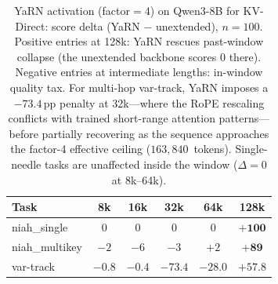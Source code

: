\begin{table}[tb]
\centering
\small
\begin{tabular}{@{}lccccc@{}}
\toprule
\textbf{Task} & 8k & 16k & 32k & 64k & 128k \\
\midrule
niah\_single & $0$ & $0$ & $0$ & $0$ & $\mathbf{+100}$ \\
niah\_multikey & $-2$ & $-6$ & $-3$ & $+2$ & $\mathbf{+89}$ \\
var-track & $-0.8$ & $-0.4$ & $\mathbf{-73.4}$ & $-28.0$ & $+57.8$ \\
\bottomrule
\end{tabular}
\caption{YaRN activation (factor$=4$) on Qwen3-8B for KV-Direct: score delta
(YaRN $-$ unextended), $n{=}100$. Positive entries at 128k: YaRN rescues
past-window collapse (the unextended backbone scores 0 there). Negative entries
at intermediate lengths: in-window quality tax. For multi-hop var-track, YaRN
imposes a $-73.4$\,pp penalty at 32k---where the RoPE rescaling conflicts with
trained short-range attention patterns---before partially recovering as the
sequence approaches the factor-4 effective ceiling ($163{,}840$~tokens).
Single-needle tasks are unaffected inside the window ($\Delta{=}0$ at 8k--64k).}
\label{tab:yarn_tax}
\end{table}

